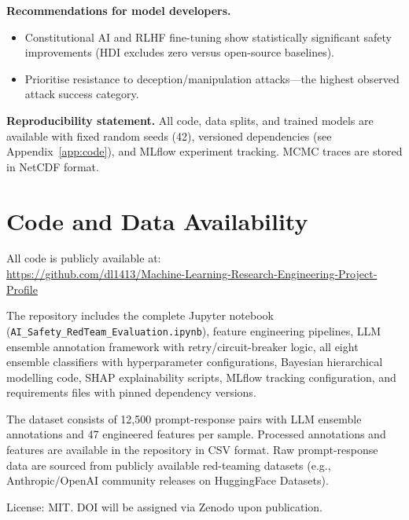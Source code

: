 \documentclass[10pt,letterpaper]{article}
\begin{document}
\textbf{Recommendations for model developers.}
\begin{itemize}
  \item Constitutional AI and RLHF fine-tuning show statistically significant
        safety improvements (HDI excludes zero versus open-source baselines).
  \item Prioritise resistance to deception/manipulation attacks---the highest
        observed attack success category.
\end{itemize}

\textbf{Reproducibility statement.}  All code, data splits, and trained models
are available with fixed random seeds (42), versioned dependencies (see
Appendix~\ref{app:code}), and MLflow experiment tracking.  MCMC traces are
stored in NetCDF format.

\section*{Code and Data Availability}

All code is publicly available at:\\
\url{https://github.com/dl1413/Machine-Learning-Research-Engineering-Project-Profile}

The repository includes the complete Jupyter notebook
(\texttt{AI\_Safety\_RedTeam\_Evaluation.ipynb}), feature engineering
pipelines, LLM ensemble annotation framework with retry/circuit-breaker logic,
all eight ensemble classifiers with hyperparameter configurations, Bayesian
hierarchical modelling code, SHAP explainability scripts, MLflow tracking
configuration, and requirements files with pinned dependency versions.

The dataset consists of 12,500 prompt-response pairs with LLM ensemble
annotations and 47 engineered features per sample.  Processed annotations and
features are available in the repository in CSV format.  Raw prompt-response
data are sourced from publicly available red-teaming datasets (e.g.,
Anthropic/OpenAI community releases on HuggingFace Datasets).

License: MIT. DOI will be assigned via Zenodo upon publication.
\end{document}
